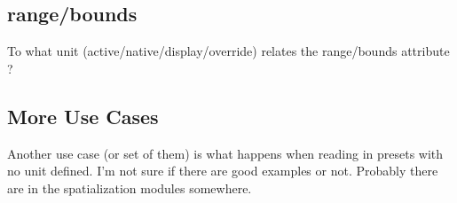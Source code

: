 \documentclass[]{article}
\begin{document}
\subsection{range/bounds}
To what unit (active/native/display/override) relates the range/bounds attribute ?

\subsection{More Use Cases}

Another use case (or set of them) is what happens when reading in presets with no unit defined.  I'm not sure if there are good examples or not.  Probably there are in the spatialization modules somewhere.







\end{document}
